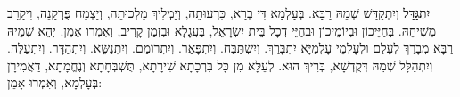 
\textbf{יִתְגַּדַּל} וְיִתְקַדַּשׁ שְׁמֵהּ רַבָּא.  בְּעָלְמָא דִּי בְרָא, כִּרְעוּתֵה, וְיַמְלִיךְ מַלְכוּתֵה, וְיַצְמַח פֻּרְקָנֵה, וִיקָרֵב מְשִׁיחֵהּ.  בְּחַיֵּיכוֹן וּבְיוֹמֵיכוֹן וּבְחַיֵּי דְכָל בֵּית יִשְׂרָאֵל, בַּעֲגָלָא וּבִזְמַן קָרִיב, וְאִמְרוּ אָמֵן.  יְהֵא שְׁמֵיהּ רַבָּא מְבָרַךְ לְעָלַם וּלְעָלְמֵי עָלְמַיָּא יִתְבָּרַךְ. וְיִשְׁתַּבַּח. וְיִתְפָּאַר. וְיִתְרוֹמַם. וְיִתְנַשֵּׂא. וְיִתְהַדָּר. וְיִתְעַלֶּה. וְיִתְהַלָּל שְׁמֵהּ דְּקֻדְשָׁא, בְּרִיךְ הוּא.  לְעֵלָּא מִן כָּל בִּרְכָתָא שִׁירָתָא, תֻּשְׁבְּחָתָא וְנֶחֱמָתָא, דַּאֲמִירָן בְּעָלְמָא, וְאִמְרוּ אָמֵן: 
